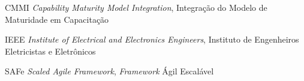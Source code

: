 \begin{siglas}
	\item[CMMI] \emph{Capability Maturity Model Integration}, Integração do Modelo de Maturidade em Capacitação
	\item[IEEE] \emph{Institute of Electrical and Electronics Engineers}, Instituto de Engenheiros Eletricistas e Eletrônicos
	\item[SAFe] \emph{Scaled Agile Framework}, \emph{Framework} Ágil Escalável
\end{siglas}
